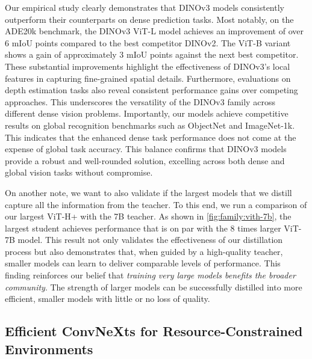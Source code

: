 Our empirical study clearly demonstrates that DINOv3 models consistently outperform their counterparts on dense prediction tasks. 
Most notably, on the ADE20k benchmark, the DINOv3 ViT-L model achieves an improvement of over 6 mIoU points compared to the best competitor DINOv2.
The ViT-B variant shows a gain of approximately 3 mIoU points against the next best competitor. 
These substantial improvements highlight the effectiveness of DINOv3's local features in capturing fine-grained spatial details. 
Furthermore, evaluations on depth estimation tasks also reveal consistent performance gains over competing approaches.
This underscores the versatility of the DINOv3 family across different dense vision problems. 
Importantly, our models achieve competitive results on global recognition benchmarks such as ObjectNet and ImageNet-1k.
This indicates that the enhanced dense task performance does not come at the expense of global task accuracy. 
This balance confirms that DINOv3 models provide a robust and well-rounded solution, excelling across both dense and global vision tasks without compromise.

On another note, we want to also validate if the largest models that we distill capture all the information from the teacher.
To this end, we run a comparison of our largest ViT-H+ with the 7B teacher.
As shown in \cref{fig:family:vith-7b}, the largest student achieves performance that is on par with the 8 times larger ViT-7B model. 
This result not only validates the effectiveness of our distillation process but also demonstrates that, when guided by a high-quality teacher, smaller models can learn to deliver comparable levels of performance. 
This finding reinforces our belief that \emph{training very large models benefits the broader community}.
The strength of larger models can be successfully distilled into more efficient, smaller models with little or no loss of quality.



    
    



\subsection{Efficient ConvNeXts for Resource-Constrained Environments}
\label{sec:family:convnext}

